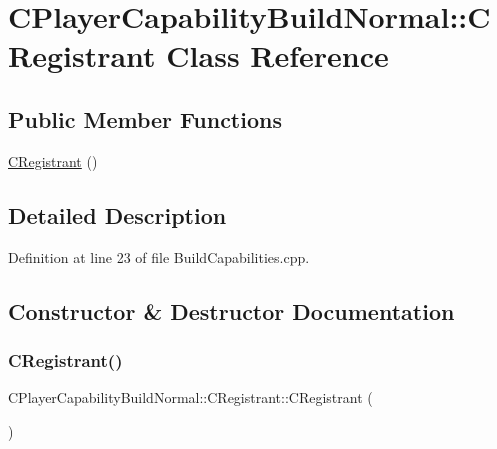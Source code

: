 \hypertarget{classCPlayerCapabilityBuildNormal_1_1CRegistrant}{}\section{C\+Player\+Capability\+Build\+Normal\+:\+:C\+Registrant Class Reference}
\label{classCPlayerCapabilityBuildNormal_1_1CRegistrant}
\subsection*{Public Member Functions}
\begin{DoxyCompactItemize}
\item 
\hyperlink{classCPlayerCapabilityBuildNormal_1_1CRegistrant_af4a7b74e621f41f2ccbadccc7f9a5a57}{C\+Registrant} ()
\end{DoxyCompactItemize}


\subsection{Detailed Description}


Definition at line 23 of file Build\+Capabilities.\+cpp.



\subsection{Constructor \& Destructor Documentation}
\hypertarget{classCPlayerCapabilityBuildNormal_1_1CRegistrant_af4a7b74e621f41f2ccbadccc7f9a5a57}{}\label{classCPlayerCapabilityBuildNormal_1_1CRegistrant_af4a7b74e621f41f2ccbadccc7f9a5a57} 
\subsubsection{\texorpdfstring{C\+Registrant()}{CRegistrant()}}
{\footnotesize\ttfamily C\+Player\+Capability\+Build\+Normal\+::\+C\+Registrant\+::\+C\+Registrant (\begin{DoxyParamCaption}{ }\end{DoxyParamCaption})}



